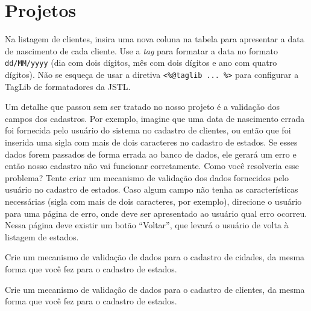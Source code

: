 \section{Projetos}

\begin{projetoSemArquivo}{}{}{}
    Na listagem de clientes, insira uma nova coluna na tabela para apresentar a data de nascimento de cada cliente. Use a \textit{tag}  para formatar a data no formato \texttt{dd/MM/yyyy} (dia com dois dígitos, mês com dois dígitos e ano com quatro dígitos). Não se esqueça de usar a diretiva \texttt{<\%@taglib ... \%>} para configurar a TagLib de formatadores da JSTL. 
\end{projetoSemArquivo}

\begin{projetoSemArquivo}{}{}{}
    Um detalhe que passou sem ser tratado no nosso projeto é a validação dos campos dos cadastros. Por exemplo, imagine que uma data de nascimento errada foi fornecida pelo usuário do sistema no cadastro de clientes, ou então que foi inserida uma sigla com mais de dois caracteres no cadastro de estados. Se esses dados forem passados de forma errada ao banco de dados, ele gerará um erro e então nosso cadastro não vai funcionar corretamente. Como você resolveria esse problema? Tente criar um mecanismo de validação dos dados fornecidos pelo usuário no cadastro de estados. Caso algum campo não tenha as características necessárias (sigla com mais de dois caracteres, por exemplo), direcione o usuário para uma página de erro, onde deve ser apresentado ao usuário qual erro ocorreu. Nessa página deve existir um botão ``Voltar'', que levará o usuário de volta à listagem de estados.
\end{projetoSemArquivo}

\begin{projetoSemArquivo}{}{}{}
    Crie um mecanismo de validação de dados para o cadastro de cidades, da mesma forma que você fez para o cadastro de estados.
\end{projetoSemArquivo}

\begin{projetoSemArquivo}{}{}{}
    Crie um mecanismo de validação de dados para o cadastro de clientes, da mesma forma que você fez para o cadastro de estados.
\end{projetoSemArquivo}